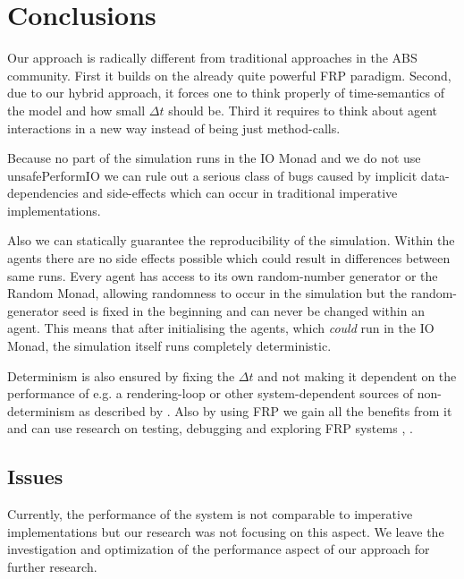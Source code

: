 \section{Conclusions}
\label{sec:conclusions}

Our approach is radically different from traditional approaches in the ABS community. First it builds on the already quite powerful FRP paradigm. Second, due to our hybrid approach, it forces one to think properly of time-semantics of the model and how small $\Delta t$ should be. Third it requires to think about agent interactions in a new way instead of being just method-calls.

Because no part of the simulation runs in the IO Monad and we do not use unsafePerformIO we can rule out a serious class of bugs caused by implicit data-dependencies and side-effects which can occur in traditional imperative implementations.

Also we can statically guarantee the reproducibility of the simulation. Within the agents there are no side effects possible which could result in differences between same runs. Every agent has access to its own random-number generator or the Random Monad, allowing randomness to occur in the simulation but the random-generator seed is fixed in the beginning and can never be changed within an agent. This means that after initialising the agents, which \textit{could} run in the IO Monad, the simulation itself runs completely deterministic.

Determinism is also ensured by fixing the $\Delta t$ and not making it dependent on the performance of e.g. a rendering-loop or other system-dependent sources of non-determinism as described by \cite{perez_testing_2017}. Also by using FRP we gain all the benefits from it and can use research on testing, debugging and exploring FRP systems \cite{perez_testing_2017}, \cite{perez_back_2017}.

\subsection*{Issues}
Currently, the performance of the system is not comparable to imperative implementations but our research was not focusing on this aspect. We leave the investigation and optimization of the performance aspect of our approach for further research.

